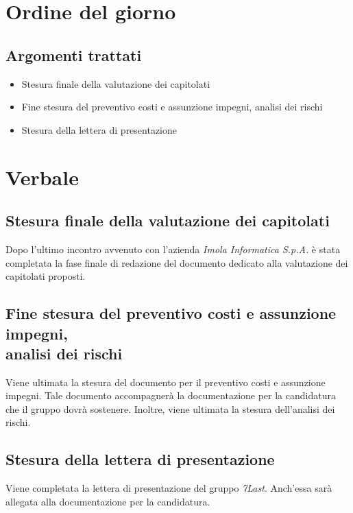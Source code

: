 \documentclass[italian,12pt]{article} %
\begin{document}
\section{Ordine del giorno}
\subsection{Argomenti trattati}
\begin{flushleft}
	\begin{itemize}
		\item Stesura finale della valutazione dei capitolati
		\item Fine stesura del preventivo costi e assunzione impegni, analisi dei rischi
		\item Stesura della lettera di presentazione
	\end{itemize}
\end{flushleft}


\newpage

\section{Verbale}
\subsection{Stesura finale della valutazione dei capitolati}
\begin{flushleft}
	Dopo l'ultimo incontro avvenuto con l'azienda \textit{Imola Informatica S.p.A.} è stata completata la fase finale di redazione del documento dedicato alla valutazione dei capitolati proposti.
\end{flushleft}
\subsection{Fine stesura del preventivo costi e assunzione impegni,\\analisi dei rischi}
\begin{flushleft}
	Viene ultimata la stesura del documento per il preventivo costi e assunzione impegni. Tale documento accompagnerà la documentazione per la candidatura che il gruppo dovrà sostenere. Inoltre, viene ultimata la stesura dell'analisi dei rischi.
\end{flushleft}
\subsection{Stesura della lettera di presentazione}
\begin{flushleft}
	Viene completata la lettera di presentazione del gruppo \textit{7Last}. Anch'essa sarà allegata alla documentazione per la candidatura.
\end{flushleft}
\end{document}
